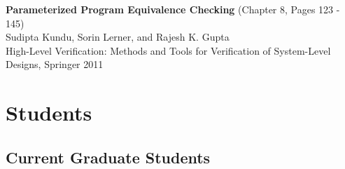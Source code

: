 \documentclass[10pt]{article}
\begin{document}
\textbf{%
Parameterized Program Equivalence Checking
} (Chapter 8, Pages 123 - 145) \\
Sudipta Kundu, Sorin Lerner, and Rajesh K. Gupta \\
High-Level Verification: Methods and Tools for Verification of System-Level Designs, Springer 2011


\section*{Students}

\subsection*{Current Graduate Students}
\end{document}
